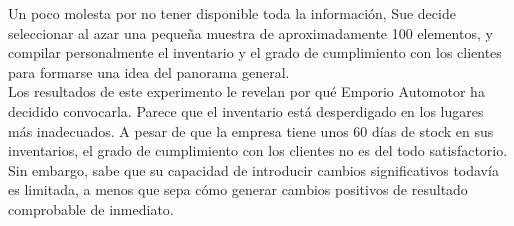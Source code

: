 \documentclass[a4paper,10pt,titlepage]{article}
\begin{document}
Un poco molesta por no tener disponible toda la información, Sue decide seleccionar al azar una pequeña muestra de aproximadamente 100 elementos, y compilar 
personalmente el inventario y el grado de cumplimiento con los clientes para formarse una idea del panorama general.\\

Los resultados de este experimento le revelan por qu\'e Emporio Automotor ha decidido convocarla. Parece que el inventario est\'a desperdigado en los lugares m\'as 
inadecuados. A pesar de que la empresa tiene unos 60 d\'ias de stock en sus inventarios, el grado de cumplimiento con los clientes no es del todo satisfactorio. \\

Sin embargo, sabe que su capacidad de introducir cambios significativos todav\'ia es limitada, a menos que sepa c\'omo generar cambios positivos de resultado 
comprobable de inmediato.\\

\newpage
\end{document}
